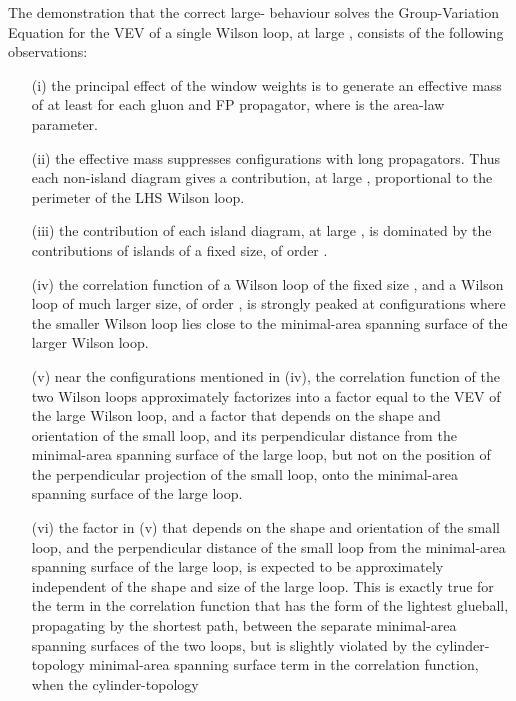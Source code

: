 \documentclass[a4paper,12pt,oneside]{article}
\begin{document}
The demonstration that the correct large-\coordHE{} behaviour solves the
Group-Variation Equation for the VEV of a single Wilson loop, at large \coordHE{},
consists of the following observations:
\begin{itemize}
	\item[(i)] the principal effect of the window weights is to generate an effective
mass of at least \myHighlight{$1.3\sqrt{\sigma}$}\coordHE{} for each gluon and FP propagator, where
\myHighlight{$\sigma$}\coordHE{} is the area-law parameter.
\item[(ii)] the effective mass suppresses configurations with long propagators.
Thus each non-island diagram gives a contribution, at large \coordHE{},
proportional to the perimeter of the LHS Wilson loop.
\item[(iii)] the contribution of each island diagram, at large \coordHE{}, is dominated by
the contributions of islands of a fixed size, of order
\coordHE{}.
\item[(iv)] the correlation function of a Wilson loop of the fixed size
\coordHE{}, and a Wilson loop of much larger size, of order
\coordHE{}, is strongly peaked at configurations where the smaller Wilson loop lies
close to the minimal-area spanning surface of the larger Wilson loop.
\item[(v)] near the configurations mentioned in (iv), the correlation function of
the two Wilson loops approximately factorizes into a factor equal to the VEV
of the large Wilson loop, and a factor that depends on the shape and
orientation of the small loop, and its perpendicular distance from the
minimal-area spanning surface of the large loop, but not on the position of
the perpendicular projection of the small loop, onto the minimal-area
spanning surface of the large loop.
\item[(vi)] the factor in (v) that depends on the shape and orientation 
of the small loop, and the perpendicular distance of the small loop from
the minimal-area spanning surface of the large loop, is expected to be
approximately independent of the shape and size of the large loop.  This 
is exactly true for the term in the correlation function that has
the form of the lightest glueball, propagating by the shortest path,
between the separate minimal-area spanning surfaces of the two loops, but
is slightly violated by the cylinder-topology minimal-area spanning 
surface term in the correlation function, when the cylinder-topology 

\end{itemize}
\end{document}
